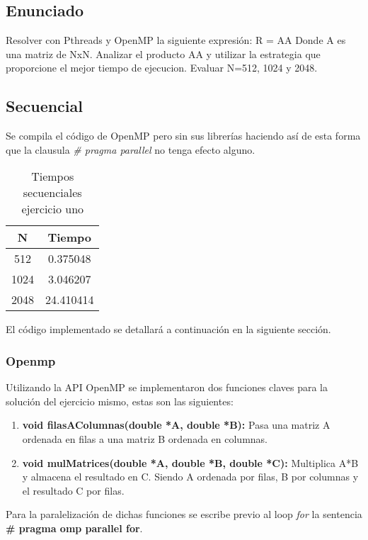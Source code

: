 \subsection{Enunciado}

Resolver con Pthreads y OpenMP la siguiente expresión: R = AA
Donde A es una matriz de NxN. Analizar el producto AA y utilizar la
estrategia que proporcione el mejor tiempo de ejecucion.
Evaluar N=512, 1024 y 2048.

\subsection{Secuencial}

Se compila el código de OpenMP pero sin sus librerías haciendo así de esta forma que la clausula \textit{\# pragma parallel} no tenga efecto alguno.

\begin{table}[htbp]
\centering
\caption{Tiempos secuenciales ejercicio uno}
\begin{tabular}{|c|c|}
\hline
\textbf{N} & \textbf{Tiempo} \\ \hline
512        & 0.375048        \\ \hline
1024       & 3.046207        \\ \hline
2048       & 24.410414       \\ \hline
\end{tabular}
\end{table}

El código implementado se detallará a continuación en la siguiente sección.
 
\subsubsection{Openmp}
Utilizando la API OpenMP se implementaron dos funciones claves para la solución del ejercicio mismo, estas son las siguientes:

\begin{enumerate}
\item \textbf{void filasAColumnas(double *A, double *B):} Pasa una matriz A ordenada en filas a una matriz B ordenada en columnas.
\item \textbf{void mulMatrices(double *A, double *B, double *C):} Multiplica A*B y almacena el resultado en C. Siendo A ordenada por filas, B por columnas y el resultado C por filas.
\end{enumerate}

Para la paralelización de dichas funciones se escribe previo al loop \textit{for} la sentencia \textbf{\# pragma omp parallel for}.

